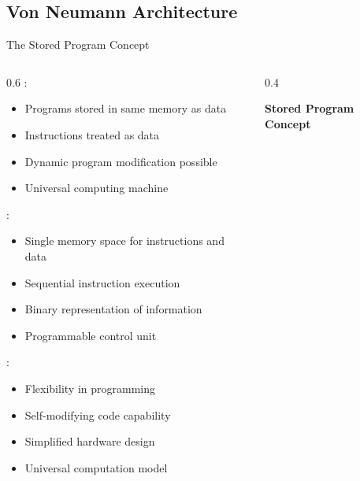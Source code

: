 \subsection{Von Neumann Architecture}

\begin{frame}{The Stored Program Concept}
\begin{columns}
\begin{column}{0.6\textwidth}
:
\begin{itemize}
\item Programs stored in same memory as data
\item Instructions treated as data
\item Dynamic program modification possible
\item Universal computing machine
\end{itemize}

\vspace{0.3cm}
:
\begin{itemize}
\item Single memory space for instructions and data
\item Sequential instruction execution
\item Binary representation of information
\item Programmable control unit
\end{itemize}

\vspace{0.3cm}
:
\begin{itemize}
\item Flexibility in programming
\item Self-modifying code capability
\item Simplified hardware design
\item Universal computation model
\end{itemize}
\end{column}
\begin{column}{0.4\textwidth}
\begin{center}
\textbf{Stored Program Concept}
\vspace{0.3cm}

\end{center}
\end{column}
\end{columns}
\end{frame}

